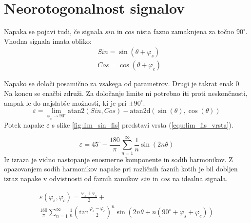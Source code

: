 



\section{Neorotogonalnost signalov}

Napaka se pojavi tudi, če signala $sin$ in $cos$ nista fazno zamaknjena za točno $90^\circ$.
Vhodna signala imata obliko:
\begin{eqnarray}
\label{equ:def_sin_fis}
&Sin = \sin(\theta + \varphi_{s})\\
\label{equ:def_cos_fis}
&Cos =\cos(\theta+\varphi_{c})
\end{eqnarray}

Napako se določi posamično za vsakega od parametrov. Drugi je takrat enak 0. Na koncu se enačbi združi. Za določanje limite ni potrebno iti proti neskončnosti, ampak le do najslabše možnosti, ki je pri $\pm 90^\circ$:
\begin{equation}
\label{equ:fis_lim}
\varepsilon = \lim_{\varphi_{s} \rightarrow 90^\circ} \mathrm{atan2}(Sin ,Cos)- \mathrm{atan2d}(\sin(\theta),\cos(\theta))
\end{equation}
Potek napake $\varepsilon$ s slike \ref{fig:lim_sin_fis} predstavi vrsta (\ref{equ:lim_fis_vrsta}).

\begin{equation}
\label{equ:lim_fis_vrsta}
\varepsilon = 45^\circ - \frac{180}{\pi}\sum_{n=1}^{\infty}\frac{1}{n} \sin (2n \theta)
\end{equation} 
Iz  izraza je vidno nastopanje enosmerne komponente in sodih harmonikov. Z opazovanjem sodih harmonikov napake pri različnih faznih kotih je bil dobljen izraz napake v odvistnosti od faznih zamikov $sin$ in $cos$ na idealna signala.

\begin{multline}
\label{equ:fis_err}
\varepsilon(\varphi_{s},\varphi_{c}) = \frac{\varphi_{s}+\varphi_{c}}{2}+\\ \frac{180}{\pi}\sum_{n=1}^{\infty}\frac{1}{n} (\mathrm{tan}\frac{\varphi_{s}-\varphi_{c}}{2})^n \sin (2n \theta+n(90^\circ +\varphi_{s}+\varphi_{c}))
\end{multline}



